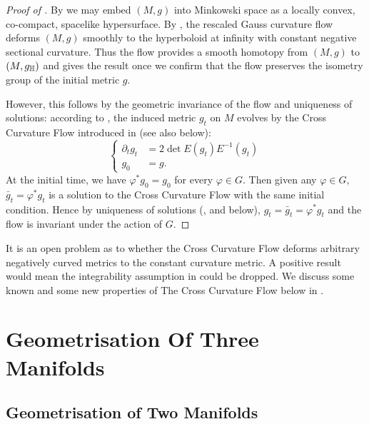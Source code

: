 \documentclass[a4paper,12pt]{amsart}
\begin{document}
\begin{proof}
[Proof of ]

By  we may embed \((M, g)\) into Minkowski space as a locally convex, co-compact, spacelike hypersurface. By \cite[Theorem 1.1]{MR3344442}, the rescaled Gauss curvature flow deforms \((M, g)\) smoothly to the hyperboloid at infinity with constant negative sectional curvature. Thus the flow provides a smooth homotopy from \((M, g)\) to \((M, g_{\mathbb{H}})\) and  gives the result once we confirm that the flow preserves the isometry group of the initial metric \(g\).

However, this follows by the geometric invariance of the flow and uniqueness of solutions: according to \cite[12. Application to the cross-curvature flow]{MR3344442}, the induced metric \(g_t\) on \(M\) evolves by the Cross Curvature Flow introduced in \cite{MR2055396} (see also  below):
\[
\begin{cases}
\partial_t g_t &= 2\det E(g_{t}) E^{-1}(g_{t}) \\
g_0 &= g.
\end{cases}
\]
At the initial time, we have \(\varphi^{\ast} g_0 = g_0\) for every \(\varphi \in G\). Then given any \(\varphi \in G\), \(\bar{g}_t = \varphi^{\ast} g_t\) is a solution to the Cross Curvature Flow with the same initial condition. Hence by uniqueness of solutions (\cite{MR2055396,MR2207496},  and  below), \(g_t = \bar{g}_t = \varphi^{\ast} g_t\) and the flow is invariant under the action of \(G\).
\end{proof}

\begin{rem}
It is an open problem as to whether the Cross Curvature Flow deforms arbitrary negatively curved metrics to the constant curvature metric. A positive result would mean the integrability assumption in  could be dropped. We discuss some known and some new properties of The Cross Curvature Flow below in .
\end{rem}

\section{Geometrisation Of Three Manifolds}
\label{sec:geometrisation}

\subsection{Geometrisation of Two Manifolds}
\label{sec:geometrisation_2d}
\end{document}

